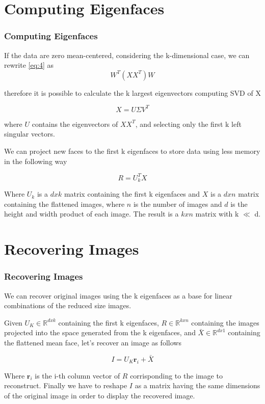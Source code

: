 \documentclass[10pt]{beamer}
\begin{document}
\section{Computing Eigenfaces}
\begin{frame}
    \frametitle{Computing Eigenfaces}
    If the data are zero mean-centered, considering the k-dimensional case, we can rewrite \eqref{eq:4} as 
    \begin{equation}
        W^T (X X^T) W
    \end{equation} 

    therefore it is possible to calculate the k largest eigenvectors computing SVD of X
    
    \begin{equation}
        X = U \Sigma V^T 
    \end{equation} 

    where $ U $ contains the eigenvectors of $ X X^T $, and selecting only the first k left singular vectors. \vspace{5 pt}

    We can project new faces to the first k eigenfaces to store data using less memory in the following way
    
    \begin{equation}
        R = U_k^T X
    \end{equation}

    \vspace{5 pt}

    Where $ U_k $ is a $ d x k $ matrix containing the first k eigenfaces and $ X $ is a $ d x n $ matrix containing the flattened images, where $ n $ is the number of images and $ d $ is the height and width product of each image.
    The result is a $ k x n $ matrix with k $ \ll $ d.

\end{frame}

\section{Recovering Images}
\begin{frame}
    \frametitle{Recovering Images}
    We can recover original images using the k eigenfaces as a base for linear combinations of the reduced size images.
    
    Given $ U_K \in \mathbb{R}^{d x k} $ containing the first k eigenfaces, $ R \in \mathbb{R}^{k x n} $ containing the images projected into the space generated from the k eigenfaces, 
    and $ \bar X \in \mathbb{R}^{d x 1} $ containing the flattened mean face, let's recover an image as follows

    \begin{equation}
        I = U_K \textbf{r}_i + \bar X
    \end{equation}

    Where $ \textbf{r}_i $ is the i-th column vector of $ R $ corrisponding to the image to reconstruct. 
    Finally we have to reshape $ I $ as a matrix having the same dimensions of the original image in order to display the recovered image.
\end{frame}
\end{document}
